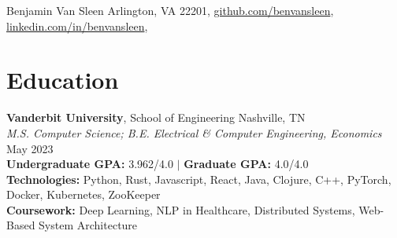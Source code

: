 \documentclass[10pt]{article}
\begin{document}
\resumeheader
{Benjamin Van Sleen}
{
	Arlington, VA 22201,
	\href{https://github.com/benvansleen}{github.com/benvansleen},
	\href{https://linkedin.com/in/benvansleen}{linkedin.com/in/benvansleen},
}

\section*{Education}
\textbf{Vanderbit University}, School of Engineering \hfill Nashville, TN \\
\hspace*{1em}\textit{M.S. Computer Science; B.E. Electrical \& Computer Engineering, Economics} \hfill May 2023 \\
\textbf{Undergraduate GPA:} 3.962/4.0 $\mid$ \textbf{Graduate GPA:} 4.0/4.0 \\
\textbf{Technologies:} Python, Rust, Javascript, React, Java, Clojure, C++, PyTorch, Docker, Kubernetes, ZooKeeper \\
\textbf{Coursework:} Deep Learning, NLP in Healthcare, Distributed Systems, Web-Based System Architecture
\end{document}
